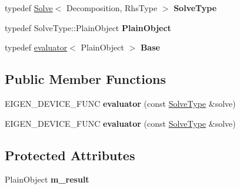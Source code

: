 \begin{DoxyCompactItemize}
typedef \hyperlink{group___core___module_class_eigen_1_1_solve}{Solve}$<$ Decomposition, Rhs\+Type $>$ {\bfseries Solve\+Type}
\item 
\mbox{\label{struct_eigen_1_1internal_1_1evaluator_3_01_solve_3_01_decomposition_00_01_rhs_type_01_4_01_4_a7969bd2265149615bc9cc60d720e1360}} 
typedef Solve\+Type\+::\+Plain\+Object {\bfseries Plain\+Object}
\item 
\mbox{\label{struct_eigen_1_1internal_1_1evaluator_3_01_solve_3_01_decomposition_00_01_rhs_type_01_4_01_4_ae033292eca5ee49c08fb3b8c4a27109e}} 
typedef \hyperlink{struct_eigen_1_1internal_1_1evaluator}{evaluator}$<$ Plain\+Object $>$ {\bfseries Base}
\end{DoxyCompactItemize}
\subsection*{Public Member Functions}
\begin{DoxyCompactItemize}
\item 
\mbox{\label{struct_eigen_1_1internal_1_1evaluator_3_01_solve_3_01_decomposition_00_01_rhs_type_01_4_01_4_a48f94f0fa4dbe41b52950740a168c47c}} 
E\+I\+G\+E\+N\+\_\+\+D\+E\+V\+I\+C\+E\+\_\+\+F\+U\+NC {\bfseries evaluator} (const \hyperlink{group___core___module_class_eigen_1_1_solve}{Solve\+Type} \&solve)
\item 
\mbox{\label{struct_eigen_1_1internal_1_1evaluator_3_01_solve_3_01_decomposition_00_01_rhs_type_01_4_01_4_a48f94f0fa4dbe41b52950740a168c47c}} 
E\+I\+G\+E\+N\+\_\+\+D\+E\+V\+I\+C\+E\+\_\+\+F\+U\+NC {\bfseries evaluator} (const \hyperlink{group___core___module_class_eigen_1_1_solve}{Solve\+Type} \&solve)
\end{DoxyCompactItemize}
\subsection*{Protected Attributes}
\begin{DoxyCompactItemize}
\item 
\mbox{\label{struct_eigen_1_1internal_1_1evaluator_3_01_solve_3_01_decomposition_00_01_rhs_type_01_4_01_4_a9bd444f627cfbe62630354701ad2a387}} 
Plain\+Object {\bfseries m\+\_\+result}
\end{DoxyCompactItemize}


